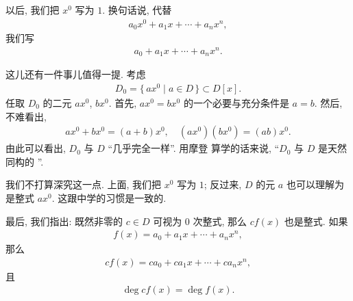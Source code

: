 \begin{remark}
    以后, 我们把 $x^0$ 写为 $1$. 换句话说, 代替
    \begin{align*}
        a_0 x^0 + a_1 x + \cdots + a_n x^n,
    \end{align*}
    我们写
    \begin{align*}
        a_0 + a_1 x + \cdots + a_n x^n.
    \end{align*}

    这儿还有一件事儿值得一提. 考虑
    \begin{align*}
        D_0 = \{\, ax^0 \mid a \in D \,\} \subset D[x].
    \end{align*}
    任取 $D_0$ 的二元 $ax^0$, $bx^0$. 首先, $ax^0 = bx^0$ 的一个必要与充分条件是 $a=b$. 然后, 不难看出,
    \begin{align*}
        ax^0 + bx^0 = (a+b)x^0, \quad (ax^0)(bx^0) = (ab)x^0.
    \end{align*}
    由此可以看出, $D_0$ 与 $D$ ``几乎完全一样''. 用摩登  算学的话来说, ``$D_0$ 与 $D$ 是天然同构的 ''.

    我们不打算深究这一点. 上面, 我们把 $x^0$ 写为 $1$; 反过来, $D$ 的元 $a$ 也可以理解为是整式 $ax^0$. 这跟中学的习惯是一致的.

    最后, 我们指出: 既然非零的 $c \in D$ 可视为 $0$ 次整式, 那么 $cf(x)$ 也是整式. 如果
    \begin{align*}
        f(x) = a_0 + a_1 x + \cdots + a_n x^n,
    \end{align*}
    那么
    \begin{align*}
        cf(x) = ca_0 + ca_1 x + \cdots + ca_n x^n,
    \end{align*}
    且
    \begin{align*}
        \deg cf(x) = \deg f(x).
    \end{align*}
\end{remark}
